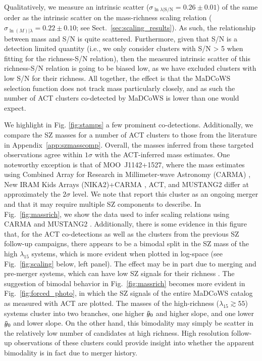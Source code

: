 \documentclass[longauth]{aa} %
\newcommand{\yc}{$\Tilde{\vary}_0$\xspace}
\begin{document}
Qualitatively, we measure an intrinsic scatter ($\sigma_{\ln{\lambda}|\text{S/N}}=0.26\pm 0.01$) of the same order as the intrinsic scatter on the mass-richness scaling relation ($\sigma_{\ln(M) | \lambda} = 0.22 \pm 0.10$; see Sect.~\ref{sec:scaling_results}). As such, the relationship between mass and S/N is quite scattered. Furthermore, given that S/N is a detection limited quantity (i.e., we only consider clusters with S/N > 5 when fitting for the richness-S/N relation), then the measured intrinsic scatter of this richness-S/N relation is going to be biased low, as we have excluded clusters with low S/N for their richness. All together, the effect is that the MaDCoWS selection function does not track mass particularly closely, and as such the number of ACT clusters co-detected by MaDCoWS is lower than one would expect.

We highlight in Fig. \ref{fig:stamps} a few prominent co-detections. Additionally, we compare the SZ masses for a number of ACT clusters to those from the literature in Appendix~\ref{app:szmasscomp}.
Overall, the masses inferred from these targeted observations agree within $1\sigma$ with the ACT-inferred mass estimates. One noteworthy exception is that of MOO~J1142+1527, where the mass estimates using Combined Array for Research in Millimeter-wave Astronomy (CARMA) \citep{Gonzalez2019}, New IRAM Kids Arrays (NIKA2)+CARMA \citep{Ruppin2020}, ACT, and MUSTANG2 \citep{Dicker2020} differ at approximately the $2\sigma$ level. We note that \cite{Moravec2020} report this cluster as an ongoing merger and that it may require multiple SZ components to describe. 
In Fig.~\ref{fig:massrich}, we show the data used to infer scaling relations using CARMA and MUSTANG2 \citep[respectively]{Gonzalez2019, Dicker2020}.  Additionally, there is some evidence in this figure that, for the ACT co-detections as well as the clusters from the previous SZ follow-up campaigns, there appears to be a bimodal split in the SZ mass of the high $\lambda_{15}$ systems, which is more evident when plotted in log-space (see Fig.~\ref{fig:scaling} below, left panel). The effect may be in part due to merging and pre-merger systems, which can have low SZ signals for their richness \citep{Dicker2020}. The suggestion of bimodal behavior in Fig.~\ref{fig:massrich} becomes more evident in Fig.~\ref{fig:forced_photo}, in which the SZ signals of the entire MaDCoWS catalog as measured with ACT are plotted. The masses of the high-richness ($\lambda_{15} \gtrsim 55$) systems cluster into two branches, one higher \yc and higher slope, and one lower \yc and lower slope. On the other hand, this bimodality may simply be scatter in the relatively low number of candidates at high richness. High resolution follow-up observations of these clusters could provide insight into whether the apparent bimodality is in fact due to merger history. 
\end{document}
